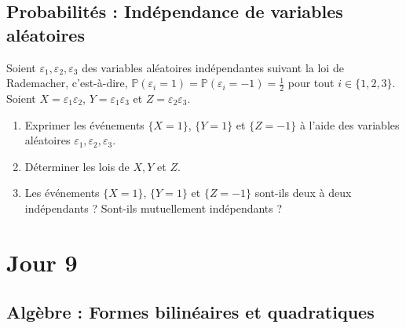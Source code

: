 \documentclass{article}
\begin{document}
    \subsection{Probabilités : Indépendance de variables aléatoires}
    Soient $\varepsilon_1, \varepsilon_2, \varepsilon_3$ des variables aléatoires indépendantes suivant la loi de Rademacher, c'est-à-dire, $\mathbb{P}(\varepsilon_i = 1) = \mathbb{P}(\varepsilon_i = -1) = \frac{1}{2}$ pour tout $i \in \{1, 2, 3\}$. Soient $X = \varepsilon_1 \varepsilon_2$, $Y = \varepsilon_1 \varepsilon_3$ et $Z = \varepsilon_2 \varepsilon_3$.
    \begin{enumerate}
        \item Exprimer les événements $\{X = 1\}$, $\{Y = 1\}$ et $\{Z = -1\}$ à l'aide des variables aléatoires $\varepsilon_1, \varepsilon_2, \varepsilon_3$.
        \item Déterminer les lois de $X, Y$ et $Z$.
        \item Les événements $\{X = 1\}$, $\{Y = 1\}$ et $\{Z = -1\}$ sont-ils deux à deux indépendants ? Sont-ils mutuellement indépendants ?
    \end{enumerate}
    
\newpage
\section{Jour 9}
    \subsection{Algèbre : Formes bilinéaires et quadratiques}
    
\end{document}
